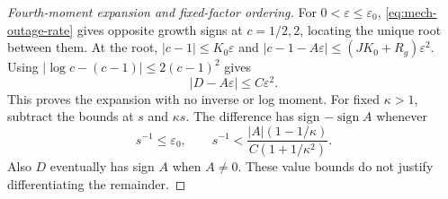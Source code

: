 \begin{proof}[Fourth-moment expansion and fixed-factor ordering]
For \(0<\varepsilon\leq\varepsilon_0\), \eqref{eq:mech-outage-rate} gives opposite growth signs at \(c=1/2,2\), locating the unique root between them. At the root,
\(|c-1|\leq K_0\varepsilon\) and
\(|c-1-A\varepsilon|\leq(JK_0+R_g)\varepsilon^2\).
Using \(|\log c-(c-1)|\leq2(c-1)^2\) gives
\begin{equation}\label{eq:mech-outage-remainder}
 |D-A\varepsilon|\leq C\varepsilon^2.
\end{equation}
This proves the expansion with no inverse or log moment. For fixed \(\kappa>1\), subtract the bounds at \(s\) and \(\kappa s\). The difference has sign \(-\operatorname{sign}A\) whenever
\begin{equation}\label{eq:mech-outage-grid}
 s^{-1}\leq\varepsilon_0,\qquad
 s^{-1}<\frac{|A|(1-1/\kappa)}{C(1+1/\kappa^2)}.
\end{equation}
Also \(D\) eventually has sign \(A\) when \(A\ne0\). These value bounds do not justify differentiating the remainder.
\end{proof}

